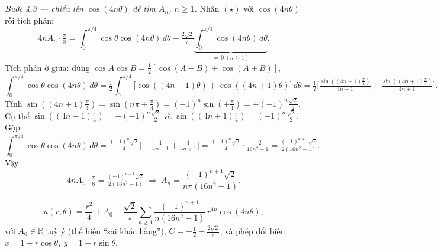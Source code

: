 \emph{Bước 4.3 --- chiếu lên $\cos(4n\theta)$ để tìm $A_n$, $n\ge1$.} Nhân $(\star)$ với $\cos(4n\theta)$ rồi tích phân:
\[
  4nA_n\cdot\tfrac{\pi}{8}=\int_0^{\pi/4}\!\!\cos\theta\cos(4n\theta)\,d\theta-\tfrac{2\sqrt2}{\pi}\underbrace{\int_0^{\pi/4}\!\!\cos(4n\theta)\,d\theta}_{=\,0\ (n\ge1)}.
\]
Tích phân ở giữa: dùng $\cos A\cos B=\tfrac12[\cos(A-B)+\cos(A+B)]$,
\[
  \int_0^{\pi/4}\!\!\cos\theta\cos(4n\theta)\,d\theta
  =\tfrac12\!\int_0^{\pi/4}\!\!\big[\cos((4n-1)\theta)+\cos((4n+1)\theta)\big]\,d\theta
  =\tfrac12\Big[\tfrac{\sin((4n-1)\tfrac{\pi}{4})}{4n-1}+\tfrac{\sin((4n+1)\tfrac{\pi}{4})}{4n+1}\Big].
\]
Tính $\sin((4n\pm1)\tfrac{\pi}{4})=\sin(n\pi\pm\tfrac{\pi}{4})=(-1)^n\sin(\pm\tfrac{\pi}{4})=\pm(-1)^n\tfrac{\sqrt2}{2}$. Cụ thể $\sin((4n-1)\tfrac{\pi}{4})=-(-1)^n\tfrac{\sqrt2}{2}$ và $\sin((4n+1)\tfrac{\pi}{4})=(-1)^n\tfrac{\sqrt2}{2}$. Gộp:
\[
  \int_0^{\pi/4}\!\!\cos\theta\cos(4n\theta)\,d\theta
  =\tfrac{(-1)^n\sqrt2}{4}\Big[-\tfrac{1}{4n-1}+\tfrac{1}{4n+1}\Big]
  =\tfrac{(-1)^n\sqrt2}{4}\cdot\tfrac{-2}{16n^2-1}
  =\tfrac{(-1)^{n+1}\sqrt2}{2(16n^2-1)}.
\]
Vậy
\[
  4nA_n\cdot\tfrac{\pi}{8}=\tfrac{(-1)^{n+1}\sqrt2}{2(16n^2-1)}
  \ \Longrightarrow\ A_n=\frac{(-1)^{n+1}\sqrt2}{n\pi(16n^2-1)}.
\]

\begin{nhobox}
\[
  u(r,\theta)=\frac{r^2}{4}+A_0+\frac{\sqrt2}{\pi}\sum_{n\ge1}\frac{(-1)^{n+1}}{n(16n^2-1)}\,r^{4n}\cos(4n\theta),
\]
với $A_0\in\mathbb R$ tuỳ ý (thể hiện ``sai khác hằng''), $C=-\tfrac12-\tfrac{2\sqrt2}{\pi}$, và phép đổi biến $x=1+r\cos\theta,\ y=1+r\sin\theta$.
\end{nhobox}
